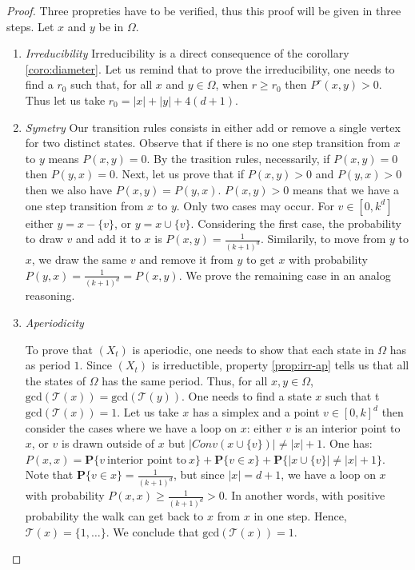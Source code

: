 \documentclass[11pt]{article}
\begin{document}
\begin{proof}
  Three propreties have to be verified, thus this proof will be given in three steps. Let $x$ and $y$ be in $\Omega$.

  \begin{enumerate}[i]
    \item \textit{Irreducibility}
    Irreducibility is a direct consequence of the corollary \ref{coro:diameter}. Let us remind that to prove the irreducibility, one needs to find a $r_0$ such that, for all $x$ and $y \in \Omega$, when $r \geq{r_0}$ then $P^r(x,y)>0$. Thus let us take $r_0 = |x| + |y| + 4(d+1)$.

     \item \textit{Symetry}
     Our transition rules consists in either add or remove a single vertex for two distinct states. Observe that if there is no one step transition from $x$ to $y$ means $P(x,y)=0$. By the trasition rules, necessarily, if $P(x,y)=0$ then $P(y,x)=0$.
     Next, let us prove that if $P(x,y)>0$ and $P(y,x)>0$ then we also have $P(x,y) = P(y,x)$. $P(x,y)>0$ means that we have a one step transition from $x$ to $y$. Only two cases may occur. For $v \in [0,k^d]$ either $y = x - \{v\}$, or $y = x \cup \{v\}$. Considering the first case, the probability to draw $v$ and add it to $x$ is $P(x,y) = \frac{1}{(k+1)^d}$. Similarily, to move from $y$ to $x$, we draw the same $v$ and remove it from $y$ to get $x$ with probability $P(y,x) = \frac{1}{(k+1)^d} = P(x,y)$. We prove the remaining case in an analog reasoning.

     \item \textit{Aperiodicity}

     To prove that $(X_t)$ is aperiodic, one needs to show that each state in $\Omega$ has as period $1$. Since $(X_t)$ is irreductible, property \ref{prop:irr-ap} tells us that all the states of $\Omega$ has the same period. Thus, for all $x, y \in \Omega$, $\mathrm{gcd}(\mathcal{T}(x)) = \mathrm{gcd}(\mathcal{T}(y))$. One needs to find a state $x$ such that t$\mathrm{gcd}(\mathcal{T}(x)) = 1$. Let us take $x$ has a simplex and a point $v \in [0,k]^d$ then consider the cases where we have a loop on $x$:
     either $v$ is an interior point to $x$, or $v$ is drawn outside of $x$ but $|Conv(x \cup \{v\})| \neq |x| + 1$. One has: $P(x,x) = \mathbf{P}\{v \  \mbox{interior point to} \ x\} + \mathbf{P}\{v \in x\} + \mathbf{P}\{|x \cup \{v\}| \neq |x| + 1\}$.
     Note that $\mathbf{P}\{v \in x\} = \frac{1}{(k+1)^d}$, but since $|x| = d+1$, we have a loop on $x$ with probability $P(x,x) \geq{\frac{1}{(k+1)^d}} > 0$. In another words, with positive probability the walk can get back to $x$ from $x$ in one step. Hence, $\mathcal{T}(x) = \{1, \dots\}$. We conclude that $\mathrm{gcd}(\mathcal{T}(x)) = 1$.

   \end{enumerate}
\end{proof}
\end{document}
